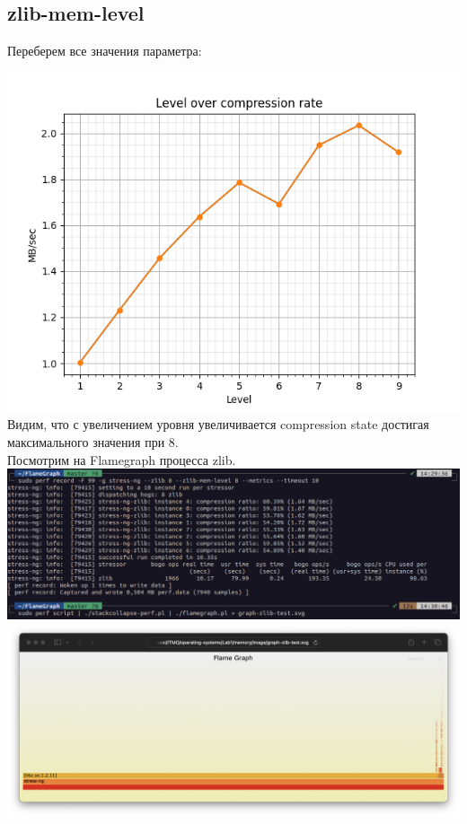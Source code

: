 \subsection{zlib-mem-level}
Переберем все значения параметра:

\includegraphics[width=\textwidth]{./memory/image/zsh-mem-level-compr.png}
Видим, что с увеличением уровня увеличивается compression state достигая максимального значения при 8.\\
Посмотрим на Flamegraph процесса zlib.\\
\includegraphics[width=\textwidth]{./memory/image/Flamegraph-script.png}
\includegraphics[width=\textwidth]{./memory/image/graph-zlib-test.png}
